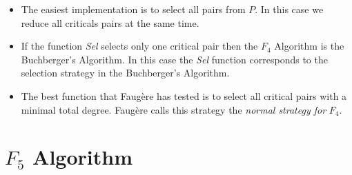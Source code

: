 \begin{itemize}
  \item The easiest implementation is to select all pairs from $P$. In this case we reduce all criticals pairs at the same time.
  \item If the function \textit{Sel} selects only one critical pair then the $F_4$ Algorithm is the Buchberger's Algorithm. In this case the \textit{Sel} function corresponds to the selection strategy in the Buchberger's Algorithm.
  \item The best function that Faug\`ere has tested is to select all critical pairs with a minimal total degree. Faug\`ere calls this strategy the \textit{normal strategy for} $F_4$.
\end{itemize}



\section{$F_5$ Algorithm}
